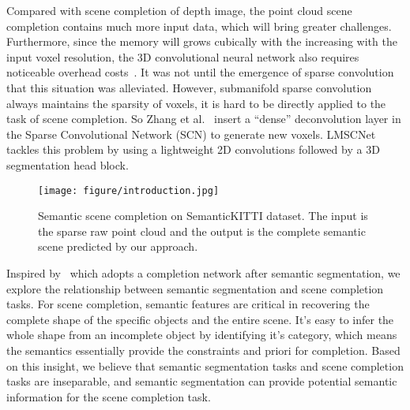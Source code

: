 \documentclass[letterpaper, 10 pt, conference]{ieeeconf}
\begin{document}
Compared with scene completion of depth image, the point cloud scene completion contains much more input data, which will bring greater challenges. Furthermore, since the memory will grows cubically with the increasing with the input voxel resolution, the 3D convolutional neural network also requires noticeable overhead costs~\cite{song2017semantic}. 
It was not until the emergence of sparse convolution~\cite{graham20183d} that this situation was alleviated. However, submanifold sparse convolution always maintains the sparsity of voxels, it is hard to be directly applied to the task of scene completion. So Zhang et al.~\cite{zhang2018efficient} insert a ``dense'' deconvolution layer in the Sparse Convolutional Network (SCN) to generate new voxels. LMSCNet~\cite{roldao2020lmscnet} tackles this problem by using a lightweight 2D convolutions followed by a 3D segmentation head block. 

\begin{figure}[t]
	\centering
	\texttt{[image: figure/introduction.jpg]}
	\caption{Semantic scene completion on SemanticKITTI dataset. The input is the sparse raw point cloud and the output is the complete semantic scene predicted by our approach.}
	\label{fig:introduction}
\end{figure}

Inspired by~\cite{yan2020sparse} which adopts a completion network after semantic segmentation, we explore the relationship between semantic segmentation and scene completion tasks. For scene completion, semantic features are critical in recovering the complete shape of the specific objects and the entire scene. It's easy to infer the whole shape from an incomplete object by identifying it's category, which means the semantics essentially provide the constraints and priori for completion. Based on this insight, we believe that semantic segmentation tasks and scene completion tasks are inseparable, and semantic segmentation can provide potential semantic information for the scene completion task.
\end{document}
